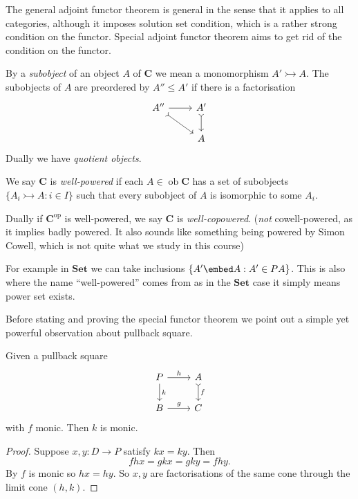 \documentclass[a4paper]{article}
\renewcommand{\c}[1]{\mathbf{#1}}
\DeclareMathOperator{\ob}{ob}
\newcommand{\Set}{{\c{Set}}}
\newcommand{\mono}{\rightarrowtail}
\begin{document}
The general adjoint functor theorem is general in the sense that it applies to all categories, although it imposes solution set condition, which is a rather strong condition on the functor. Special adjoint functor theorem aims to get rid of the condition on the functor.

\begin{definition}
  By a \emph{subobject} of an object \(A\) of \(\c C\) we mean a monomorphism \(A' \mono A\). The subobjects of \(A\) are preordered by \(A'' \leq A'\) if there is a factorisation
  \[
    \begin{tikzcd}
      A'' \ar[r] \ar[dr, rightarrowtail] & A' \ar[d, rightarrowtail] \\
      & A
    \end{tikzcd}
  \]
  Dually we have \emph{quotient objects}.
\end{definition}

\begin{definition}
  We say \(\c C\) is \emph{well-powered} if each \(A \in \ob \c C\) has a set of subobjects \(\{A_i \mono A: i \in I\}\) such that every subobject of \(A\) is isomorphic to some \(A_i\).

  Dually if \(\c C^{\text{op}}\) is well-powered, we say \(\c C\) is \emph{well-copowered}. (\emph{not} cowell-powered, as it implies badly powered. It also sounds like something being powered by Simon Cowell, which is not quite what we study in this course)
\end{definition}

For example in \(\Set\) we can take inclusions \(\{A' \embed A: A ' \in PA\}\). This is also where the name ``well-powered'' comes from as in the \(\Set\) case it simply means power set exists.

Before stating and proving the special functor theorem we point out a simple yet powerful observation about pullback square.

\begin{lemma}
  Given a pullback square
  \[
    \begin{tikzcd}
      P \ar[r, "h"] \ar[d, "k"] & A \ar[d, "f", rightarrowtail] \\
      B \ar[r, "g"] & C
    \end{tikzcd}
  \]
  with \(f\) monic. Then \(k\) is monic.
\end{lemma}

\begin{proof}
  Suppose \(x, y: D \to P\) satisfy \(kx = ky\). Then
  \[
    fhx = gkx = gky = fhy.
  \]
  By \(f\) is monic so \(hx = hy\). So \(x, y\) are factorisations of the same cone through the limit cone \((h, k)\).
\end{proof}
\end{document}
